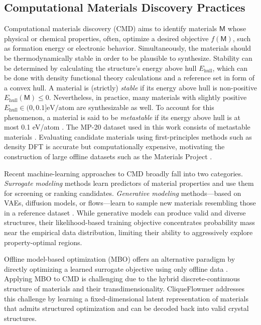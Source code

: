 \documentclass{article}
\theoremstyle{plain}
\theoremstyle{definition}
\theoremstyle{remark}
\begin{document}
\subsection{Computational Materials Discovery Practices}
\label{sec:appendix-CMD}

Computational materials discovery (CMD) aims to identify materials $\mathsf{M}$ whose physical or chemical properties, often, optimize a desired objective $f(\mathsf{M})$, such as formation energy or electronic behavior. 
Simultaneously, the materials should be thermodynamically stable in order to be plausible to synthesize.
Stability can be determined by calculating the structure's energy above hull $E_{\text{hull}}$, which can be done with density functional theory \citep[DFT]{kohn1965self} calculations and a reference set in form of a convex hull.
A material is (strictly) \emph{stable} if its energy above hull is non-positive $E_{\text{hull}}(\mathsf{M}) \leq 0$.
Nevertheless, in practice, many materials with slightly positive $E_{\text{hull}}\in(0, 0.1]\text{eV/atom}$ are synthesizable as well.
To account for this phenomenon, a material is said to be \emph{metastable} if its energy above hull is at most 0.1 eV/atom \citep{jain2013commentary, kirklin2015open, sun2016thermodynamic}.
The MP-20 dataset used in this work consists of metastable materials \citep{xie2021crystal}.
Evaluating candidate materials using first-principles methods such as density DFT is accurate but computationally expensive, motivating the construction of large offline datasets such as the Materials Project \citep{jain2013commentary}.

Recent machine-learning approaches to CMD broadly fall into two categories. \emph{Surrogate modeling} methods learn predictors of material properties and use them for screening or ranking candidates. \emph{Generative modeling} methods—based on VAEs, diffusion models, or flows—learn to sample new materials resembling those in a reference dataset \citep{xie2021crystal,zeni2023mattergen,cao2025space}. While generative models can produce valid and diverse structures, their likelihood-based training objective concentrates probability mass near the empirical data distribution, limiting their ability to aggressively explore property-optimal regions.

Offline model-based optimization (MBO) offers an alternative paradigm by directly optimizing a learned surrogate objective using only offline data \citep{kumar2020conservative,trabucco2022design}. Applying MBO to CMD is challenging due to the hybrid discrete-continuous structure of materials and their transdimensionality. CliqueFlowmer addresses this challenge by learning a fixed-dimensional latent representation of materials that admits structured optimization and can be decoded back into valid crystal structures.
\end{document}
